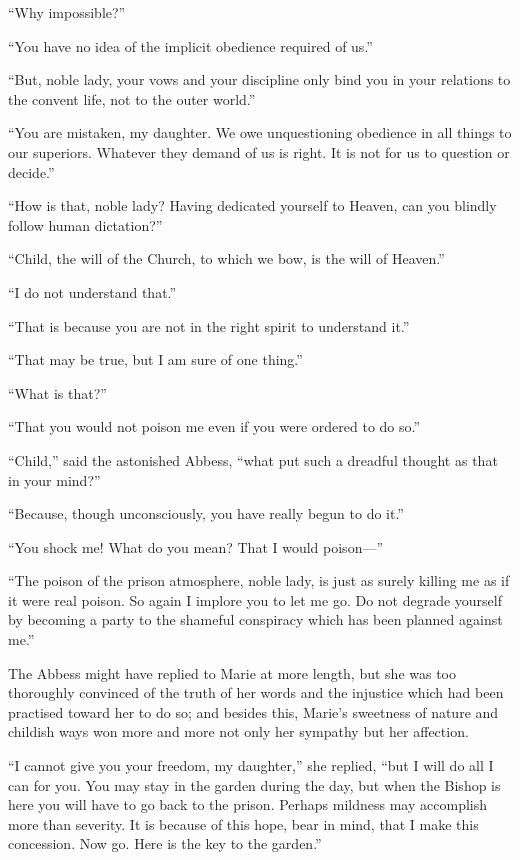 ``Why impossible?''

``You have no idea of the implicit obedience required of us.''

``But, noble lady, your vows and your discipline only bind you in your
relations to the convent life, not to the outer world.''

``You are mistaken, my daughter. We owe unquestioning obedience in all
things to our superiors. Whatever they demand of us is right. It is not
for us to question or decide.''

``How is that, noble lady? Having dedicated yourself to Heaven, can you
blindly follow human dictation?''

``Child, the will of the Church, to which we bow, is the will of
Heaven.''

``I do not understand that.''

``That is because you are not in the right spirit to understand it.''

``That may be true, but I am sure of one thing.''

``What is that?''

``That you would not poison me even if you were ordered to do so.''

``Child,'' said the astonished Abbess, ``what put such a dreadful
thought as that in your mind?''

``Because, though unconsciously, you have really begun to do it.''

``You shock me! What do you mean? That I would poison---''

``The poison of the prison atmosphere, noble lady, is just as surely
killing me as if it were real poison. So again I implore you to let me
go. Do not degrade yourself by becoming a party to the shameful
conspiracy which has been planned against me.''

The Abbess might have replied to Marie at more length, but she was too
thoroughly convinced of the truth of her words and the injustice which
had been practised toward her to do so; and besides this, Marie's
sweetness of nature and childish ways won more and more not only her
sympathy but her affection.

``I cannot give you your freedom, my daughter,'' she replied, ``but I
will do all I can for you. You may stay in the garden during the day,
but when the Bishop is here you will have to go back to the prison.
Perhaps mildness may accomplish more than severity. It is because of
this hope, bear in mind, that I make this concession. Now go. Here is
the key to the garden.''

